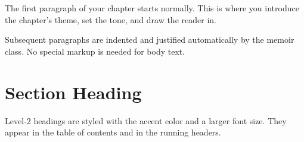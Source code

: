 %
%
%


The first paragraph of your chapter starts normally. This is where you
introduce the chapter's theme, set the tone, and draw the reader in.

Subsequent paragraphs are indented and justified automatically by the
memoir class. No special markup is needed for body text.

\section{Section Heading}

Level-2 headings are styled with the accent color and a larger font size.
They appear in the table of contents and in the running headers.

